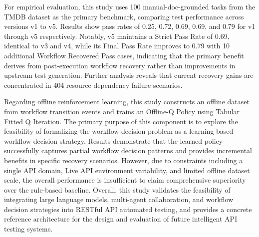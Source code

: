 \begin{EnAbstract}
\begin{EnAbstractDescription}
        \text For empirical evaluation, this study uses 100 manual-doc-grounded tasks from the TMDB dataset as the primary benchmark, comparing test performance across versions v1 to v5. Results show pass rates of 0.25, 0.72, 0.69, 0.69, and 0.79 for v1 through v5 respectively. Notably, v5 maintains a Strict Pass Rate of 0.69, identical to v3 and v4, while its Final Pass Rate improves to 0.79 with 10 additional Workflow Recovered Pass cases, indicating that the primary benefit derives from post-execution workflow recovery rather than improvements in upstream test generation. Further analysis reveals that current recovery gains are concentrated in 404 resource dependency failure scenarios.

        \text Regarding offline reinforcement learning, this study constructs an offline dataset from workflow transition events and trains an Offline-Q Policy using Tabular Fitted Q Iteration. The primary purpose of this component is to explore the feasibility of formalizing the workflow decision problem as a learning-based workflow decision strategy. Results demonstrate that the learned policy successfully captures partial workflow decision patterns and provides incremental benefits in specific recovery scenarios. However, due to constraints including a single API domain, Live API environment variability, and limited offline dataset scale, the overall performance is insufficient to claim comprehensive superiority over the rule-based baseline. Overall, this study validates the feasibility of integrating large language models, multi-agent collaboration, and workflow decision strategies into RESTful API automated testing, and provides a concrete reference architecture for the design and evaluation of future intelligent API testing systems.
    \end{EnAbstractDescription}
    
\end{EnAbstract}

